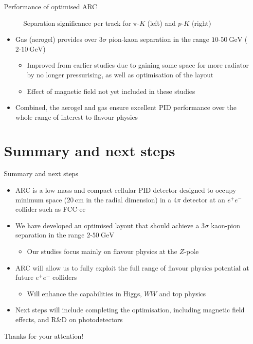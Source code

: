 \documentclass{beamer}
\begin{document}
\begin{frame}{Performance of optimised ARC}
\begin{figure}
\begin{subfigure}{0.5\textwidth}
    \end{subfigure}
    \vspace{-0.4cm}
    \caption{Separation significance per track for $\pi$-$K$ (left) and $p$-$K$ (right)}
  \end{figure}
  \vspace{-0.4cm}
  \begin{itemize}
    \setlength\itemsep{0.0em}
    \item{Gas (aerogel) provides over $3\sigma$ pion-kaon separation in the range $10$-$\SI{50}{\giga\eV}$ ($2$-$\SI{10}{\giga\eV}$)}
    \begin{itemize}
      \item{Improved from earlier studies due to gaining some space for more radiator by no longer pressurising, as well as optimisation of the layout}
      \item{Effect of magnetic field not yet included in these studies}
    \end{itemize}
    \item{Combined, the aerogel and gas ensure excellent PID performance over the whole range of interest to flavour physics}
  \end{itemize}
\end{frame}

\section{Summary and next steps}
\begin{frame}{Summary and next steps}
  \begin{itemize}
    \setlength\itemsep{1.0em}
    \item{ARC is a low mass and compact cellular PID detector designed to occupy minimum space ($\SI{20}{\centi\meter}$ in the radial dimension) in a $4\pi$ detector at an $e^+e^-$ collider such as FCC-ee}
    \item{We have developed an optimised layout that should achieve a $3\sigma$ kaon-pion separation in the range $2$-$\SI{50}{\giga\eV}$}
    \begin{itemize}
      \item{Our studies focus mainly on flavour physics at the $Z$-pole}
    \end{itemize}
    \item{ARC will allow us to fully exploit the full range of flavour physics potential at future $e^+e^-$ colliders}
    \begin{itemize}
      \item{Will enhance the capabilities in Higgs, $WW$ and top physics}
    \end{itemize}
    \item{Next steps will include completing the optimisation, including magnetic field effects, and R\&D on photodetectors}
  \end{itemize}
  \begin{center}
    \huge Thanks for your attention!
  \end{center}
\end{frame}
\end{document}
